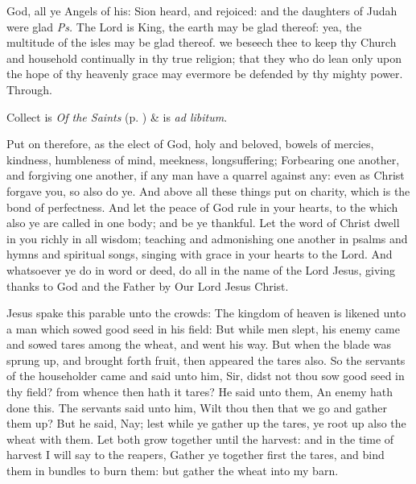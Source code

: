 \introit
{} God, all ye Angels of his: Sion heard, and rejoiced: and the daughters of Judah were glad \textit{Ps.} The Lord is King, the earth may be glad thereof: yea, the multitude of the isles may be glad thereof.
\collect
{} we beseech thee to keep thy Church and household continually in thy true religion; that they who do lean only upon the hope of thy heavenly grace may evermore be defended by thy mighty power. Through.
\begin{rubric}
     Collect is \emph{Of the Saints} (p. \pageref{SPSaints}) \&  is \emph{ad libitum}.
\end{rubric}
 Put on therefore, as the elect of God, holy and beloved, bowels of mercies, kindness, humbleness of mind, meekness, longsuffering; Forbearing one another, and forgiving one another, if any man have a quarrel against any: even as Christ forgave you, so also do ye. And above all these things put on charity, which is the bond of perfectness. And let the peace of God rule in your hearts, to the which also ye are called in one body; and be ye thankful. Let the word of Christ dwell in you richly in all wisdom; teaching and admonishing one another in psalms and hymns and spiritual songs, singing with grace in your hearts to the Lord. And whatsoever ye do in word or deed, do all in the name of the Lord Jesus, giving thanks to God and the Father by Our Lord Jesus Christ.

 Jesus spake this parable unto the crowds: The kingdom of heaven is likened unto a man which sowed good seed in his field: But while men slept, his enemy came and sowed tares among the wheat, and went his way. But when the blade was sprung up, and brought forth fruit, then appeared the tares also. So the servants of the householder came and said unto him, Sir, didst not thou sow good seed in thy field? from whence then hath it tares? He said unto them, An enemy hath done this. The servants said unto him, Wilt thou then that we go and gather them up? But he said, Nay; lest while ye gather up the tares, ye root up also the wheat with them. Let both grow together until the harvest: and in the time of harvest I will say to the reapers, Gather ye together first the tares, and bind them in bundles to burn them: but gather the wheat into my barn.

